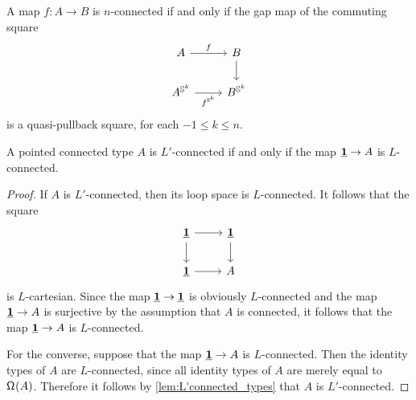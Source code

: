 \begin{cor}
A map $f:A\to B$ is $n$-connected if and only if the gap map of the commuting square
\begin{equation*}
\begin{tikzcd}
A \arrow[r,"f"] & B \arrow[d] \\
A^{\sphere{k}} \arrow[r,swap,"f^{\sphere{k}}"] & B^{\sphere{k}}
\end{tikzcd}
\end{equation*}
is a quasi-pullback square, for each $-1\leq k\leq n$.
\end{cor}

\begin{cor}
A pointed connected type $A$ is $L'$-connected if and only if the map $\underline{\mathbf{1}}\to A$ is $L$-connected.
\end{cor}

\begin{proof}
If $A$ is $L'$-connected, then its loop space is $L$-connected. It follows that the square
\begin{equation*}
\begin{tikzcd}
\unit \arrow[r] \arrow[d] & \unit \arrow[d] \\
\unit \arrow[r] & A
\end{tikzcd}
\end{equation*}
is $L$-cartesian. Since the map $\underline{\mathbf{1}}\to\underline{\mathbf{1}}$ is obviously $L$-connected and the map $\underline{\mathbf{1}}\to A$ is surjective by the assumption that $A$ is connected, it follows that the map $\underline{\mathbf{1}}\to A$ is $L$-connected.

For the converse, suppose that the map $\underline{\mathbf{1}}\to A$ is $L$-connected. Then the identity types of $A$ are $L$-connected, since all identity types of $A$ are merely equal to $\mathsf{\Omega}^{}(A)$. Therefore it follows by \cref{lem:L'connected_types} that $A$ is $L'$-connected.
\end{proof}

